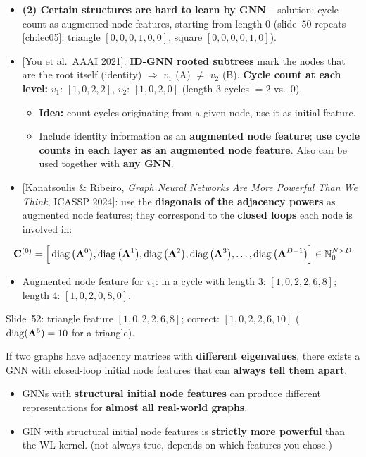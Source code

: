 \begin{itemize}
  \item \textbf{(2) Certain structures are hard to learn by GNN} -- solution:
    cycle count as augmented node features, starting from length 0 (slide~50
    repeats \cref{ch:lec05}: triangle $[0,0,0,1,0,0]$, square
    $[0,0,0,0,1,0]$).
  \item {} [You et al.\ AAAI 2021]: \textbf{ID-GNN rooted
    subtrees} mark the nodes that are the root itself (identity) $\Rightarrow$
    $v_1$ (A) $\neq$ $v_2$ (B). \textbf{Cycle count at each level:} $v_1$:
    $[1,0,2,2]$, $v_2$: $[1,0,2,0]$ (length-3 cycles $=2$ vs.\ $0$).
    \begin{itemize}
      \item \textbf{Idea:} count cycles originating from a given node, use it as
        initial feature.
      \item Include identity information as an \textbf{augmented node feature};
        \textbf{use cycle counts in each layer as an augmented node feature}. Also
        can be used together with \textbf{any GNN}.
    \end{itemize}
  \item {} [Kanatsoulis \& Ribeiro, \emph{Graph
    Neural Networks Are More Powerful Than We Think}, ICASSP 2024]: use the
    \textbf{diagonals of the adjacency powers} as augmented node features; they
    correspond to the \textbf{closed loops} each node is involved in:
\end{itemize}
\begin{equation}\label{eq:lec07-loops}
  \mathbf{C}^{(0)} = \Big[\operatorname{diag}\big(\mathbf{A}^0\big), \operatorname{diag}\big(\mathbf{A}^1\big), \operatorname{diag}\big(\mathbf{A}^2\big),
    \operatorname{diag}\big(\mathbf{A}^3\big), \dots, \operatorname{diag}\big(\mathbf{A}^{D-1}\big)\Big]
  \in \mathbb{N}_0^{N\times D}
\end{equation}
\begin{itemize}
  \item Augmented node feature for $v_1$: in a cycle with length 3:
    $[1,0,2,2,6,8]$; length 4: $[1,0,2,0,8,0]$.
\end{itemize}
\begin{caution}
  Slide~52: triangle feature $[1,0,2,2,6,8]$; correct: $[1,0,2,2,6,10]$
  ($\operatorname{diag}(\mathbf{A}^5)=10$ for a triangle).
\end{caution}
\begin{proposition}\label{prop:lec07-loops}
  If two graphs have adjacency matrices with \textbf{different eigenvalues}, there
  exists a GNN with closed-loop initial node features that can \textbf{always tell
  them apart}.
\end{proposition}
\begin{itemize}
  \item GNNs with \textbf{structural initial node features} can produce different
    representations for \textbf{almost all real-world graphs}.
  \item GIN with structural initial node features is \textbf{strictly more
    powerful} than the WL kernel. (not always true, depends on which features you chose.)
\end{itemize}

